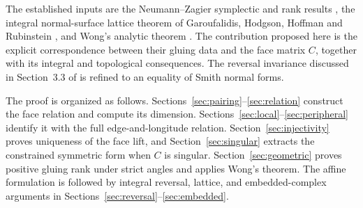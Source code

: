 \documentclass[11pt]{article}
\theoremstyle{definition}\newtheorem{definition}[theorem]{Definition}
\theoremstyle{remark}\newtheorem{remark}[theorem]{Remark}
\begin{document}
The established inputs are the Neumann--Zagier symplectic and rank results \cite{NZ,Neumann}, the integral normal-surface lattice theorem of Garoufalidis, Hodgson, Hoffman and Rubinstein \cite{GHHHR}, and Wong's analytic theorem \cite{Wong}. The contribution proposed here is the explicit correspondence between their gluing data and the face matrix $C$, together with its integral and topological consequences. The reversal invariance discussed in Section~3.3 of \cite{BGW} is refined to an equality of Smith normal forms.

The proof is organized as follows. Sections~\ref{sec:pairing}--\ref{sec:relation} construct the face relation and compute its dimension. Sections~\ref{sec:local}--\ref{sec:peripheral} identify it with the full edge-and-longitude relation. Section~\ref{sec:injectivity} proves uniqueness of the face lift, and Section~\ref{sec:singular} extracts the constrained symmetric form when $C$ is singular. Section~\ref{sec:geometric} proves positive gluing rank under strict angles and applies Wong's theorem. The affine formulation is followed by integral reversal, lattice, and embedded-complex arguments in Sections~\ref{sec:reversal}--\ref{sec:embedded}.
\end{document}
